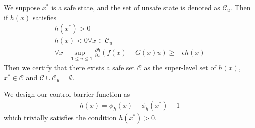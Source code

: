 \documentclass{article}
\begin{document}
We suppose $x^*$ is a safe state, and the set of unsafe state is denoted as $\mathcal{C}_u$. Then if $h(x)$ satisfies
\begin{subequations}
\begin{align}
	h(x^*) > 0\\
	h(x) < 0 \forall x\in\mathcal{C}_u\\
	\forall x\;\sup_{-\mathbf{1}\le u\le\mathbf{1}} \frac{\partial h}{\partial x}(f(x) + G(x)u) \ge -\epsilon h(x)
\end{align}
\end{subequations}
Then we certify that there exists a safe set $\mathcal{C}$ as the super-level set of $h(x)$, $x^*\in\mathcal{C}$ and $\mathcal{C} \cup \mathcal{C}_u=\emptyset$.

We design our control barrier function as
\begin{align}
	h(x) = \phi_h(x) - \phi_h(x^*) + 1
\end{align}
which trivially satisfies the condition $h(x^*) > 0$.
\end{document}

